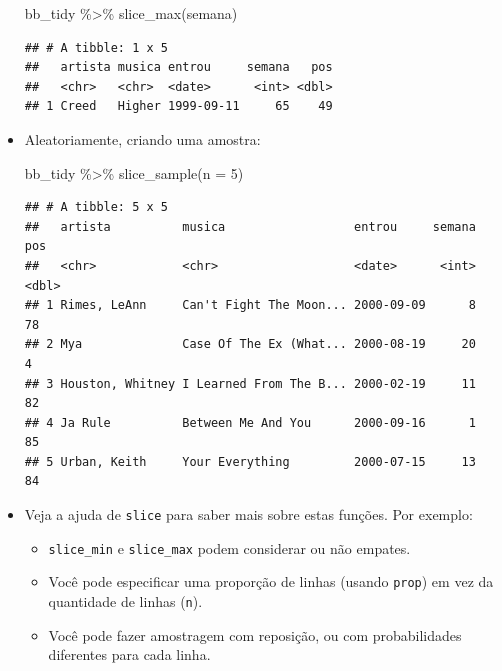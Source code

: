 \documentclass[
  11pt]{report}
\newenvironment{Shaded}{\begin{snugshade}}{\end{snugshade}}
\newcommand{\AttributeTok}[1]{\textcolor[rgb]{0.77,0.63,0.00}{#1}}
\newcommand{\DecValTok}[1]{\textcolor[rgb]{0.00,0.00,0.81}{#1}}
\newcommand{\FunctionTok}[1]{\textcolor[rgb]{0.00,0.00,0.00}{#1}}
\newcommand{\NormalTok}[1]{#1}
\newcommand{\SpecialCharTok}[1]{\textcolor[rgb]{0.00,0.00,0.00}{#1}}
\renewenvironment{Shaded}{
    \begin{mdframed}[%
      roundcorner=2pt,%
      innerleftmargin=5pt,%
      innerrightmargin=5pt,%
      topline=true,%
      leftline=true,%
      rightline=true,%
      bottomline=true,%
      linewidth=0.5pt,%
      linecolor=black!20,%
      backgroundcolor=black!2,%
      skipabove=2ex,%
      skipbelow=2.5ex%
    ]%
  }
  {
    \end{mdframed}
  }
\begin{document}
\begin{itemize}
\begin{Shaded}
\begin{Highlighting}[]
\NormalTok{bb\_tidy }\SpecialCharTok{\%\textgreater{}\%} 
  \FunctionTok{slice\_max}\NormalTok{(semana)}
\end{Highlighting}
\end{Shaded}

\begin{verbatim}
## # A tibble: 1 x 5
##   artista musica entrou     semana   pos
##   <chr>   <chr>  <date>      <int> <dbl>
## 1 Creed   Higher 1999-09-11     65    49
\end{verbatim}
\item
  Aleatoriamente, criando uma amostra:

\begin{Shaded}
\begin{Highlighting}[]
\NormalTok{bb\_tidy }\SpecialCharTok{\%\textgreater{}\%} 
  \FunctionTok{slice\_sample}\NormalTok{(}\AttributeTok{n =} \DecValTok{5}\NormalTok{)}
\end{Highlighting}
\end{Shaded}

\begin{verbatim}
## # A tibble: 5 x 5
##   artista          musica                  entrou     semana   pos
##   <chr>            <chr>                   <date>      <int> <dbl>
## 1 Rimes, LeAnn     Can't Fight The Moon... 2000-09-09      8    78
## 2 Mya              Case Of The Ex (What... 2000-08-19     20     4
## 3 Houston, Whitney I Learned From The B... 2000-02-19     11    82
## 4 Ja Rule          Between Me And You      2000-09-16      1    85
## 5 Urban, Keith     Your Everything         2000-07-15     13    84
\end{verbatim}
\item
  Veja a ajuda de \texttt{slice} para saber mais sobre estas funções. Por exemplo:

  \begin{itemize}
  \item
    \texttt{slice\_min} e \texttt{slice\_max} podem considerar ou não empates.
  \item
    Você pode especificar uma proporção de linhas (usando \texttt{prop}) em vez da quantidade de linhas (\texttt{n}).
  \item
    Você pode fazer amostragem com reposição, ou com probabilidades diferentes para cada linha.
  \end{itemize}
\end{itemize}
\end{document}
